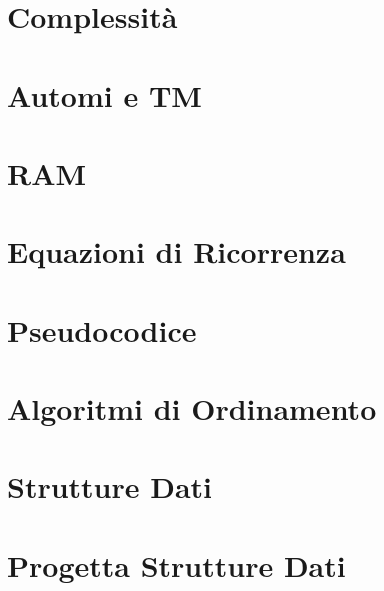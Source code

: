 



\begin{titlepage}
    \maketitle
    \thispagestyle{empty}  %
\end{titlepage}

\section{Complessità}

\newpage

\section{Automi e TM}

\newpage

\section{RAM}

\newpage

\section{Equazioni di Ricorrenza}

\newpage

\section{Pseudocodice}

\newpage

\section{Algoritmi di Ordinamento}

\newpage

\section{Strutture Dati}

\newpage

\section{Progetta Strutture Dati}


